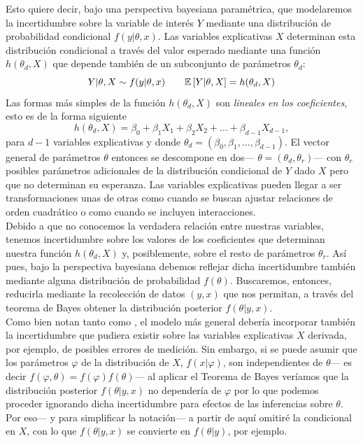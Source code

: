 Esto quiere decir, bajo una perspectiva bayesiana paramétrica, que modelaremos la incertidumbre sobre la variable de interés $Y$ mediante una distribución de probabilidad condicional $f(y|\theta,x)$. Las variables explicativas $X$ determinan esta distribución condicional a través del valor esperado mediante una función $h(\theta_d,X)$ que depende también de un subconjunto de parámetros $\theta_d$: 
\begin{equation} \label{eq:regr_gral}
Y|\theta,X \sim f(y|\theta,x) \qquad \mathbb{E}\left[ Y|\theta,X \right] = h(\theta_d,X)
\end{equation} 
Las formas más simples de la función $h(\theta_d,X)$ son \textit{lineales en los coeficientes}, esto es de la forma siguiente 
\begin{equation*}
h(\theta_d,X) = \beta_0 + \beta_1X_1 + \beta_2X_2 + \dots + \beta_{d-1}X_{d-1}, 
\end{equation*}
para $d-1$ variables explicativas y donde $\theta_d = (\beta_0,\beta_1,\dots,\beta_{d-1})$. El vector general de parámetros $\theta$ entonces se descompone en dos--- $\theta = (\theta_d,\theta_r)$--- con $\theta_r$ posibles parámetros adicionales de la distribución condicional de $Y$ dado $X$ pero que no determinan su esperanza. Las variables explicativas pueden llegar a ser transformaciones unas de otras como cuando se buscan ajustar relaciones de orden cuadrático o como cuando se incluyen interacciones.\\

Debido a que no conocemos la verdadera relación entre nuestras variables, tenemos incertidumbre sobre los valores de los coeficientes que determinan nuestra función $h(\theta_d ,X)$ y, posiblemente, sobre el resto de parámetros $\theta_r$. Así pues, bajo la perspectiva bayesiana debemos reflejar dicha incertidumbre también mediante alguna distribución de probabilidad $f(\theta)$. Buscaremos, entonces, reducirla mediante la recolección de datos $(y,x)$ que nos permitan, a través del teorema de Bayes obtener la distribución posterior $f(\theta|y,x)$.\\

Como bien notan tanto \textcite{Gelman13} como \textcite{Congdon06}, el modelo más general debería incorporar también la incertidumbre que pudiera existir sobre las variables explicativas $X$ derivada, por ejemplo, de posibles errores de medición. Sin embargo, si se puede asumir que los parámetros $\varphi$ de la distribución de $X$, $f(x|\varphi)$, son independientes de $\theta$--- es decir $f(\varphi,\theta)=f(\varphi)f(\theta)$--- al aplicar el Teorema de Bayes veríamos que la distribución posterior $f(\theta|y,x)$ no dependería de $\varphi$ por lo que podemos proceder ignorando dicha incertidumbre para efectos de las inferencias sobre $\theta$. Por eso--- y para simplificar la notación--- a partir de aquí omitiré la condicional en $X$, con lo que $f(\theta|y,x)$ se convierte en $f(\theta|y)$, por ejemplo. \\

